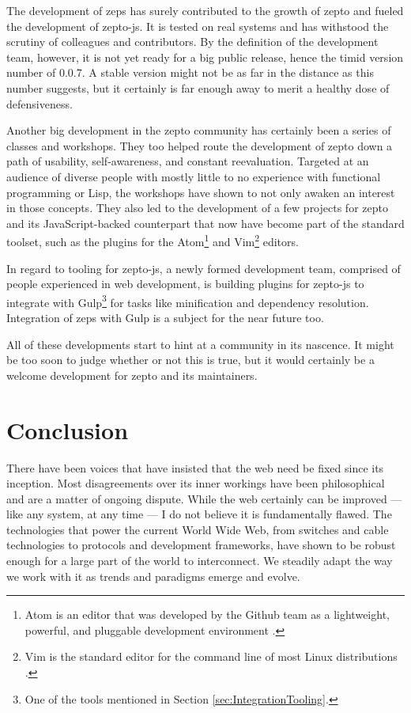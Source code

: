 \documentclass[oneside,11pt,xetex]{scrbook}
\begin{document}
The development of \gls{zeps} has surely contributed to the growth of zepto and
fueled the development of zepto-js. It is tested on real systems and has
withstood the scrutiny of colleagues and contributors. By the definition of the
development team, however, it is not yet ready for a big public release, hence
the timid version number of 0.0.7. A stable version might not be as far in the
distance as this number suggests, but it certainly is far enough away to merit
a healthy dose of defensiveness.

Another big development in the zepto community has certainly been a series of
classes and workshops. They too helped route the development of zepto down
a path of usability, self-awareness, and constant reevaluation. Targeted at an
audience of diverse people with mostly little to no experience with functional
programming or Lisp, the workshops have shown to not only awaken an interest in those
concepts. They also led to the development of a few projects for zepto and its
JavaScript-backed counterpart that now have become part of the standard toolset,
such as the plugins for the Atom\footnote{Atom is an editor that was developed by
the Github team as a lightweight, powerful, and pluggable development environment
\parencite{ATOM}.} and Vim\footnote{Vim is the standard editor for the command line
of most Linux distributions \parencite{VIM}.} editors.

In regard to tooling for zepto-js, a newly formed development team, comprised of
people experienced in web development, is building plugins for zepto-js to integrate
with Gulp\footnote{One of the tools mentioned in Section \ref{sec:IntegrationTooling}.} for
tasks like minification and dependency resolution. Integration of \gls{zeps} with
Gulp is a subject for the near future too.

All of these developments start to hint at a community in its nascence. It might
be too soon to judge whether or not this is true, but it would certainly be a welcome
development for zepto and its maintainers.

\chapter{Conclusion}
\label{chap:conclusion}

There have been voices that have insisted that the web need be fixed
since its inception. Most disagreements over its inner workings
have been philosophical and are a matter of ongoing dispute.
While the web certainly can be improved --- like any system,
at any time --- I do not believe it is fundamentally flawed. The
technologies that power the current World Wide Web, from switches
and cable technologies to protocols and development frameworks,
have shown to be robust enough for a large part of the world
to interconnect. We steadily adapt the way we work with it
as trends and paradigms emerge and evolve.
\end{document}
